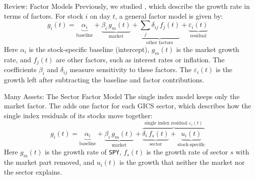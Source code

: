 \documentclass[aspectratio=169,11pt]{beamer}
\begin{document}
\begin{frame}{Review: Factor Models}
  Previously, we studied , which describe the growth rate in terms of
  factors. For stock $i$ on day $t$, a general factor model is given by:
  \begin{equation*}
    g_{i}(t)=\underbrace{\alpha_{i}}_{\textstyle\text{baseline}}+\underbrace{\beta_{i}\,g_{m}(t)}_{\textstyle\text{market}}+\underbrace{\textstyle\sum_{j}\delta_{ij}\,f_{j}(t)}_{\textstyle\text{other factors}}+\underbrace{\varepsilon_{i}(t)}_{\textstyle\text{residual}}
  \end{equation*}
  Here $\alpha_i$ is the stock-specific baseline (intercept), $g_m(t)$ is the market growth rate, and
  $f_j(t)$ are other factors, such as interest rates or inflation. The coefficients $\beta_i$
  and $\delta_{ij}$ measure sensitivity to these factors. The 
  $\varepsilon_i(t)$ is the growth left after subtracting the baseline and factor contributions.
\end{frame}

\begin{frame}{Many Assets: The Sector Factor Model}
  The single index model keeps only the market factor. The  adds one
  factor for each GICS sector, which describes how the single index residuals of its stocks move together:
  \begin{equation*}
    g_{i}(t)=\underbrace{\alpha_{i}}_{\textstyle\text{baseline}}+\underbrace{\beta_{i}\,g_{m}(t)}_{\textstyle\text{market}}+\overbrace{\underbrace{\delta_{i}\,f_{s}(t)}_{\textstyle\text{sector}}+\underbrace{u_{i}(t)}_{\textstyle\text{stock-specific}}}^{\textstyle\text{single index residual }\varepsilon_{i}(t)}
  \end{equation*}
  Here $g_m(t)$ is the growth rate of \texttt{SPY}, $f_s(t)$ is the growth rate of sector $s$
  with the market part removed, and $u_i(t)$ is the growth that neither the market nor the
  sector explains.
\end{frame}
\end{document}
